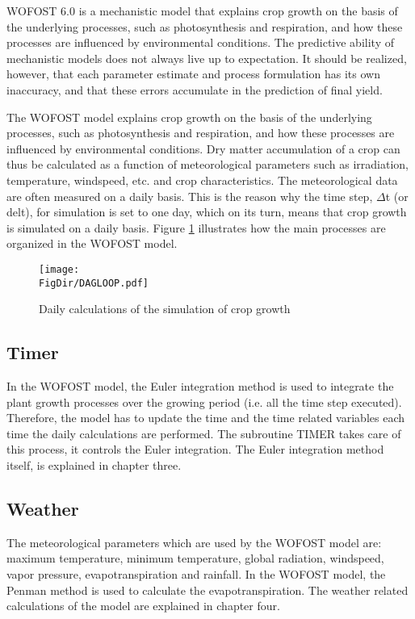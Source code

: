 WOFOST 6.0 is a mechanistic model that explains crop growth on the basis of the 
underlying processes, such as photosynthesis and respiration, and how these processes are
influenced by environmental conditions. The predictive ability of mechanistic models does
not always live up to expectation. It should be realized, however, that each parameter
estimate and process formulation has its own inaccuracy, and that these errors accumulate
in the prediction of final yield.

The WOFOST model explains crop growth on the basis of the underlying processes, such
as photosynthesis and respiration, and how these processes are influenced by environmental 
conditions. Dry matter accumulation of a crop can thus be calculated as a function
of meteorological parameters such as irradiation, temperature, windspeed, etc. and crop
characteristics. The meteorological data are often measured on a daily basis. This is the
reason why the time step, $\Delta$t (or delt), for simulation is set to one day, which on its turn,
means that crop growth is simulated on a daily basis. Figure \ref{fig:DailySimLoop} illustrates 
how the main processes are organized in the WOFOST model.

\begin{figure}[htbp]
\centering
\texttt{[image: \\FigDir/DAGLOOP.pdf]}
\caption{Daily calculations of the simulation of crop growth}
\label{fig:DailySimLoop}
\end{figure}

\subsection{Timer}
In the WOFOST model, the Euler integration method is used to integrate the plant growth
processes over the growing period (i.e. all the time step executed). Therefore, the model
has to update the time and the time related variables each time the daily calculations are
performed. The subroutine TIMER takes care of this process, it controls the Euler
integration. The Euler integration method itself, is explained in chapter three.

\subsection{Weather}
The meteorological parameters which are used by the WOFOST model are: maximum
temperature, minimum temperature, global radiation, windspeed, vapor pressure,
evapotranspiration and rainfall. In the WOFOST model, the Penman method is used to
calculate the evapotranspiration. The weather related calculations of the model are
explained in chapter four.

